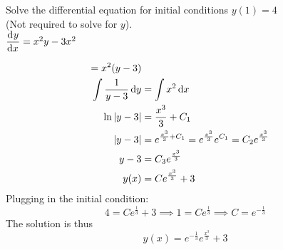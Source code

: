 \documentclass[12pt,answers]{exam}
\begin{document}
\begin{questions}
\newpage
\question[10]
Solve the differential equation for initial conditions $y(1) = 4$ 
\\
(Not required to solve for $y$).
\\
$\dod{y}{x} = x^2 y - 3x^2$
\begin{solution}
  \begin{align*}
    = x^2(y-3) \\ 
    \int \frac{1}{y-3} \dif y &= \int x^2 \dif x \\ 
    \ln|y-3| &= \frac{x^3}{3} + C_1 \\ 
    |y-3| &= e^{\frac{x^3}{3} + C_1} 
    = e^{\frac{x^3}{3}} e^{C_1}
    = C_2 e^{\frac{x^3}{3}} \\
    y-3 &= C_3 e^{\frac{x^3}{3}} \\ 
    y(x) &= C e^{\frac{x^3}{3}} + 3
  \end{align*}
  Plugging in the initial condition:
  \[
    4 = C e^{\frac13} + 3 \implies 1 = C e^{\frac13} \implies C = e^{-\frac13}
  \]
  The solution is thus
  \[
    \boxed{y(x) = e^{-\frac13} e^{\frac{x^3}{3}} + 3}
  \]
\end{solution}

\end{questions}
\end{document}
